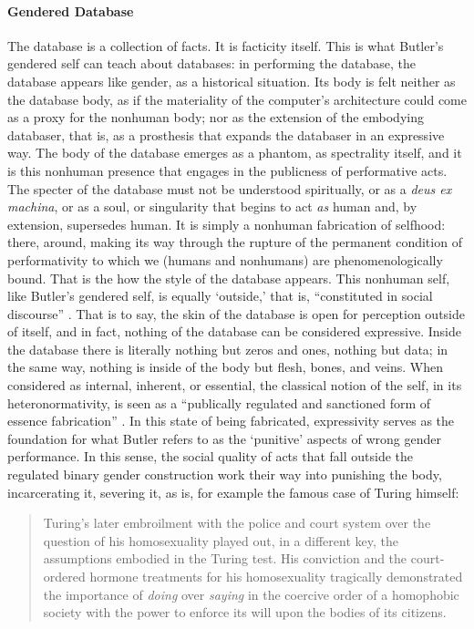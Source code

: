 \paragraph{Gendered Database}
The database is a collection of facts. It is facticity itself. This is what Butler's gendered self can teach about databases: in performing the database, the database appears like gender, as a historical situation. Its body is felt neither as the database body, as if the materiality of the computer's architecture could come as a proxy for the nonhuman body; nor as the extension of the embodying databaser, that is, as a prosthesis that expands the databaser in an expressive way. The body of the database emerges as a phantom, as spectrality itself, and it is this nonhuman presence that engages in the publicness of performative acts. The specter of the database must not be understood spiritually, or as a \textit{deus ex machina}, or as a soul, or singularity that begins to act \textit{as} human and, by extension, supersedes human. It is simply a nonhuman fabrication of selfhood: there, around, making its way through the rupture of the permanent condition of performativity to which we (humans and nonhumans) are phenomenologically bound. That is the how the style of the database appears. This nonhuman self, like Butler's gendered self, is equally `outside,' that is, ``constituted in social discourse'' \parencite[528]{But88:Per}. That is to say, the skin of the database is open for perception outside of itself, and in fact, nothing of the database can be considered expressive. Inside the database there is literally nothing but zeros and ones, nothing but data; in the same way, nothing is inside of the body but flesh, bones, and veins. When considered as internal, inherent, or essential, the classical notion of the self, in its heteronormativity, is seen as a ``publically regulated and sanctioned form of essence fabrication'' \parencite[528]{But88:Per}. In this state of being fabricated, expressivity serves as the foundation for what Butler refers to as the `punitive' aspects of wrong gender performance. In this sense, the social quality of acts that fall outside the regulated binary gender construction work their way into punishing the body, incarcerating it, severing it, as is, for example the famous case of Turing himself:

\begin{quote}
	Turing's later embroilment with the police and court system over the question of his homosexuality played out, in a different key, the assumptions embodied in the Turing test. His conviction and the court-ordered hormone treatments for his homosexuality tragically demonstrated the importance of \textit{doing} over \textit{saying} in the coercive order of a homophobic society with the power to enforce its will upon the bodies of its citizens. \parencite[xii]{Hay99:How}
\end{quote}

